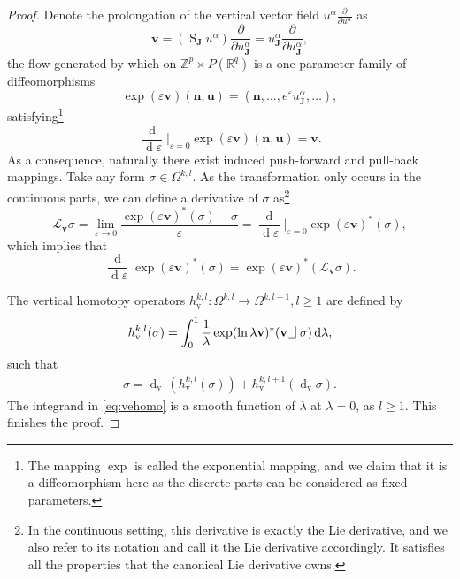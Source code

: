 \documentclass[11pt]{article} %
\numberwithin{equation}{section}
\newcommand{\intpsym}{\,\, \setlength{\unitlength}{0.4mm}
	\begin{picture}(0, 0)(5, 5)%
	\put(0, 4){\line(1,0){5}} \put(5,4){\line(0,1){8}}
	\end{picture}\,\,}
\newcommand{\intp}{\,\,\intpsym}
\newcommand{\es}{\operatorname{S}}
\newcommand{\upd}{\operatorname{d}}
\newcommand{\upv}{\operatorname{v}}
\newcommand{\dv}{\upd_{\upv}\!}
\newcommand{\mbn}{\mathbf{n}}
\newcommand{\mbu}{\mathbf{u}}
\newcommand{\mbv}{\mathbf{v}}
\newcommand{\mbJ}{\mathbf{J}}
\newcommand{\mcL}{\mathcal{L}}
\theoremstyle{plain}
\theoremstyle{definition}
\begin{document}
\begin{proof}
Denote the prolongation of the vertical vector field
$u^{\alpha}\frac{\partial}{\partial u^{\alpha}}$ as
\begin{equation}
\mbv={(\es_{\mbJ}u^{\alpha})\frac{\partial}{\partial
u^{\alpha}_{\mbJ}}} ={u^{\alpha}_{\mbJ}\frac{\partial}{\partial
u^{\alpha}_{\mbJ}}},
\end{equation}
the flow generated by which on $\mathbb{Z}^p\times P(\mathbb{R}^q)$ is a
one-parameter family of diffeomorphisms
\begin{equation}
\exp(\varepsilon \mbv)(\mbn,\mbu)=(\mbn,\ldots,e^{\varepsilon}u^{\alpha}_{\mbJ},\ldots),
\end{equation}
satisfying\footnote{ The mapping $\exp$ is  called the
exponential mapping, and we claim that it is a diffeomorphism here
as the discrete parts can be considered as fixed parameters.}
\begin{equation}
\frac{\upd}{\upd\!\varepsilon}\Big|_{\varepsilon=0}\exp(\varepsilon
\mbv)(\mbn,\mbu)=\mbv.
\end{equation}
 As a consequence, naturally there exist induced push-forward and
pull-back mappings. Take any form $\sigma\in\Omega^{k,l}$. As the
transformation only occurs in the continuous parts, we can define
a derivative of $\sigma$ as\footnote{ In the continuous setting, this derivative
is exactly the Lie derivative, and we also refer to its notation and
call it the Lie derivative accordingly. It satisfies all the
properties that the canonical Lie derivative owns.}
\begin{equation}\label{lieddiscrete}
\mcL_{\mbv}\sigma=\lim_{\varepsilon\rightarrow0}\frac{\exp(\varepsilon \mbv)^{\ast}(\sigma)-\sigma}{\varepsilon}=\frac{\upd}{\upd\!\varepsilon}\Big|_{\varepsilon=0}
{\exp(\varepsilon \mbv)^{\ast}(\sigma)},
\end{equation}
which implies that
\begin{equation}
\frac{\upd}{\upd\!\varepsilon}{\exp(\varepsilon \mbv)^{\ast}(\sigma)}=
\exp(\varepsilon \mbv)^{\ast}(\mcL_\mbv\sigma).
\end{equation}

The
vertical homotopy operators
$h_{\upv}^{k,l}:\Omega^{k,l}\rightarrow\Omega^{k,l-1},l\geq1$ are defined by
\begin{equation}\label{eq:vehomo}
h^{k,l}_{\upv}(\sigma)=\int_0^1{\frac{1}{\lambda}\exp(\ln\lambda
\mbv)^{\ast}(\mbv\intp\sigma) \upd\!\lambda},
\end{equation}
such that
\begin{equation}
\begin{aligned}
\sigma=\dv\,(h_{\upv}^{k,l}(\sigma))
+h_{\upv}^{k,l+1}(\dv \sigma).
\end{aligned}
\end{equation}
The integrand in \eqref{eq:vehomo} is a smooth function of
$\lambda$ at $\lambda=0$, as $l\geq1$. This finishes the proof.
\end{proof}
\end{document}
